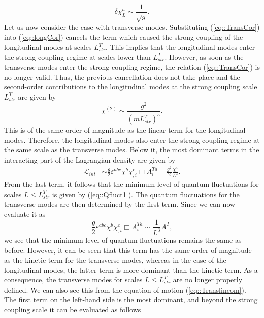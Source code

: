 \documentclass{article}
\begin{document}
\begin{equation}\label{eq::Qfluct1}
    \delta\chi^a_L\sim\frac{1}{\sqrt{g}}.
\end{equation}
Let us now consider the case with transverse modes. Substituting (\ref{eq::TransCor}) into (\ref{eq::longCor}) cancels the term which caused the strong coupling of the longitudinal modes at scales $L^T_{str}$. This implies that the longitudinal modes enter the strong coupling regime at scales lower than $L^T_{str}$. However, as soon as the transverse modes enter the strong coupling regime, the relation (\ref{eq::TransCor}) is no longer valid. Thus, the previous cancellation does not take place and the second-order contributions to the longitudinal modes at the strong coupling scale $L_{str}^T$ are given by 
\begin{equation}
    \chi^{(2)}\sim\frac{g^2}{\left(mL_{str}^T\right)^5}.
\end{equation}
This is of the same order of magnitude as the linear term for the longitudinal modes. Therefore, the longitudinal modes also enter the strong coupling regime at the same scale as the transverse modes. Below it, the most dominant terms in the interacting part of the Lagrangian density are given by 
\begin{equation}
    \begin{split}
        \mathcal{L}_{int}&\sim\frac{g}{2}\varepsilon^{abc}\chi^b\chi^c_{,i}\Box A_i^{Ta}
        +\frac{g^2}{2}\frac{\chi^4}{L^4}.
    \end{split}
\end{equation}
From the last term, it follows that the minimum level of quantum fluctuations for scales $L\leq L_{str}^T$ is given by (\ref{eq::Qfluct1}). The quantum fluctuations for the transverse modes are then determined by the first term. Since  we can now evaluate it as
\begin{equation}
    \frac{g}{2}\varepsilon^{abc}\chi^b\chi^c_{,i}\Box A_i^{Ta}\sim\frac{1}{L^3}A^T,
\end{equation}
we see that the minimum level of quantum fluctuations remains the same as before. However, it can be seen that this term has the same order of magnitude as the kinetic term for the transverse modes, whereas in the case of the longitudinal modes, the latter term is more dominant than the kinetic term. As a consequence, the transverse modes for scales $L\leq L_{str}^T$ are no longer properly defined. We can also see this from the equation of motion (\ref{eq::Translineom}). The first term on the left-hand side is the most dominant, and beyond the strong coupling scale it can be evaluated as follows 
\end{document}
